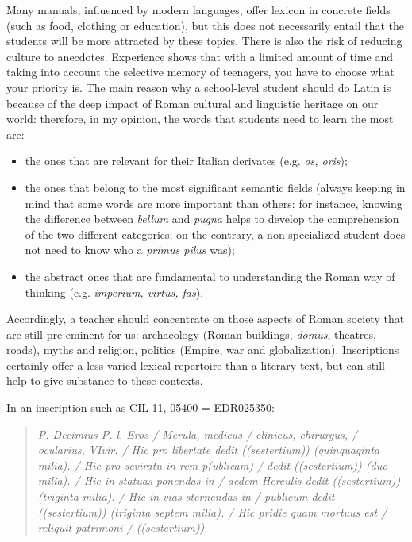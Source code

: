 \documentclass[amsthm,ebook]{saparticle}
\begin{document}
Many manuals, influenced by modern languages, offer lexicon in concrete fields (such as food, clothing or education),
but this does not necessarily entail that the students will be more attracted by these topics. There is also the risk
of reducing culture to anecdotes. Experience shows that with a limited amount of time and taking into account the
selective memory of teenagers, you have to choose what your priority is. The main reason why a school-level student
should do Latin is because of the deep impact of Roman cultural and linguistic heritage on our world: therefore, in my
opinion, the words that students need to learn the most are:

\begin{itemize}
\item the ones that are relevant for their Italian derivates (e.g. \emph{os, oris});
\item the ones that belong to the most significant semantic fields (always keeping in mind that some words are more
important than others: for instance, knowing the difference between \emph{bellum} and \emph{pugna} helps to develop the comprehension
of the two different categories; on the contrary, a non-specialized student does not need to know who a \emph{primus pilus}
was);
\item the abstract ones that are fundamental to understanding the Roman way of thinking (e.g. \emph{imperium, virtus, fas}).
\end{itemize}
Accordingly, a teacher should concentrate on those aspects of Roman society that are still pre-eminent for us:
archaeology (Roman buildings, \emph{domus}, theatres, roads), myths and religion, politics (Empire, war and globalization).
Inscriptions certainly offer a less varied lexical repertoire than a literary text, but can still help to give
substance to these contexts.

In an inscription such as CIL 11, 05400 = \href{http://www.edr-edr.it/edr\_programmi/res\_complex\_comune.php?do=book\&id\_nr=EDR025350}{EDR025350}:

\begin{quotation}
\emph{P. Decimius P. l. Eros / Merula, medicus / clinicus, chirurgus, / ocularius, VIvir. / Hic pro libertate dedit
((sestertium)) (quinquaginta milia). / Hic pro seviratu in rem p(ublicam) / dedit ((sestertium)) (duo milia). / Hic in
statuas ponendas in / aedem Herculis dedit ((sestertium)) (triginta milia). / Hic in vias sternendas in / publicum
dedit ((sestertium)) (triginta septem milia). / Hic pridie quam mortuus est / reliquit patrimoni / ((sestertium)) --- }
\end{quotation}
\end{document}
